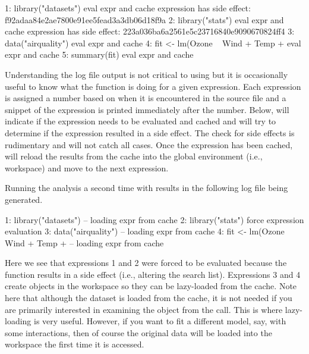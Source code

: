 \documentclass[nojss]{jss}
\begin{document}
\begin{Schunk}
\begin{Soutput}
1: library("datasets")
  eval expr and cache
  expression has side effect: f92adaa84e2ae7800e91ee5fead3a3db06d18f9a
2: library("stats")
  eval expr and cache
  expression has side effect: 223a036ba6a2561e5c23716840e9090670824ff4
3: data("airquality")
  eval expr and cache
4: fit <- lm(Ozone ~ Wind + Temp + 
  eval expr and cache
5: summary(fit)
  eval expr and cache
\end{Soutput}
\end{Schunk}
Understanding the log file output is not critical to using
 but it is occasionally useful to know what the function
is doing for a given expression.  Each expression is assigned a number
based on when it is encountered in the source file and a snippet of
the expression is printed immediately after the number.  Below,
 will indicate if the expression needs to be evaluated
and cached and will try to determine if the expression resulted in a
side effect.  The check for side effects is rudimentary and will not
catch all cases.  Once the expression has been cached, 
will reload the results from the cache into the global environment
(i.e., workspace) and move to the next expression.

Running the analysis a second time with  results in the
following log file being generated.
\begin{Schunk}
\begin{Soutput}
1: library("datasets")
  -- loading expr from cache
2: library("stats")
  force expression evaluation
3: data("airquality")
  -- loading expr from cache
4: fit <- lm(Ozone ~ Wind + Temp + 
  -- loading expr from cache
\end{Soutput}
\end{Schunk}
Here we see that expressions 1 and 2 were forced to be evaluated
because the  function results in a side effect
(i.e., altering the search list).  Expressions 3 and 4 create objects
in the workspace so they can be lazy-loaded from the cache.  Note here
that although the  dataset is loaded from the cache,
it is not needed if you are primarily interested in examining the
 object from the  call.  This is where lazy-loading
is very useful.  However, if you want to fit a different model, say,
with some interactions, then of course the original data will be
loaded into the workspace the first time it is accessed.
\end{document}
